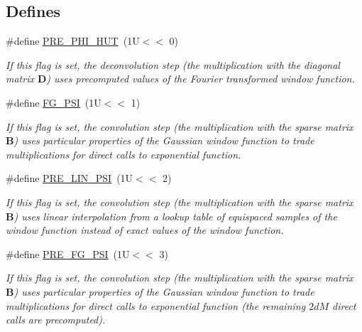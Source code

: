 \subsection*{Defines}
\begin{CompactItemize}
\item 
\#define \hyperlink{group__nfft_gda3a356fdaf5840f98374a0a7aaf3e9c}{PRE\_\-PHI\_\-HUT}~(1U$<$$<$ 0)
\begin{CompactList}\small\item\em If this flag is set, the deconvolution step (the multiplication with the diagonal matrix $\mathbf{D}$) uses precomputed values of the Fourier transformed window function. \item\end{CompactList}\item 
\#define \hyperlink{group__nfft_g01ebac2d2071639df189f083fc9f24eb}{FG\_\-PSI}~(1U$<$$<$ 1)
\begin{CompactList}\small\item\em If this flag is set, the convolution step (the multiplication with the sparse matrix $\mathbf{B}$) uses particular properties of the Gaussian window function to trade multiplications for direct calls to exponential function. \item\end{CompactList}\item 
\#define \hyperlink{group__nfft_gbb1ad048b695cb806baf010c5d1b2caf}{PRE\_\-LIN\_\-PSI}~(1U$<$$<$ 2)
\begin{CompactList}\small\item\em If this flag is set, the convolution step (the multiplication with the sparse matrix $\mathbf{B}$) uses linear interpolation from a lookup table of equispaced samples of the window function instead of exact values of the window function. \item\end{CompactList}\item 
\#define \hyperlink{group__nfft_g9c5a5ab61009a801082897ca40a1658c}{PRE\_\-FG\_\-PSI}~(1U$<$$<$ 3)
\begin{CompactList}\small\item\em If this flag is set, the convolution step (the multiplication with the sparse matrix $\mathbf{B}$) uses particular properties of the Gaussian window function to trade multiplications for direct calls to exponential function (the remaining $2dM$ direct calls are precomputed). \item\end{CompactList}\item 

\end{CompactItemize}
